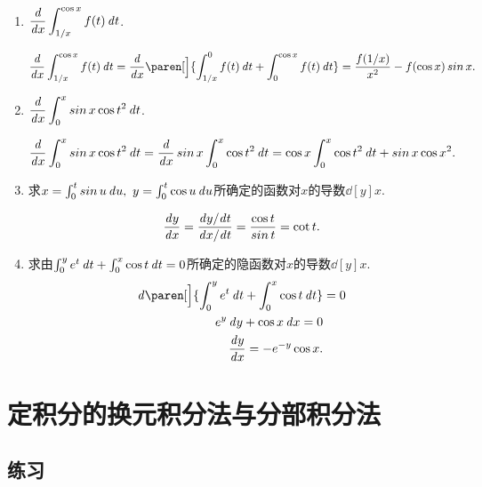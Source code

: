 \begin{enumerate}
\item \(\displaystyle \frac{\mathop{}\!\mathit{d}}{\mathop{}\!\mathit{d} x} \int_{1/x}^{\cos x} f(t) \mathop{}\!\mathit{d} t\).

  \ifshowsol
    \[
      \ddx \int_{1/x}^{\cos x} f(t) \dt
      = \ddx \paren[\Big]{\int_{1/x}^0 f(t) \dt + \int_0^{\cos x} f(t) \dt}
      = \frac{f(1/x)}{x^2} - f(\cos x) \sin x .
    \]
  \fi

\item \(\displaystyle \frac{\mathop{}\!\mathit{d}}{\mathop{}\!\mathit{d} x} \int_0^x \operatorname{\smash{sin}} x \cos t^2 \mathop{}\!\mathit{d} t\).

  \ifshowsol
    \[
      \frac{\mathop{}\!\mathit{d}}{\mathop{}\!\mathit{d} x} \int_0^x \operatorname{\smash{sin}} x \cos t^2 \mathop{}\!\mathit{d} t
      = \frac{\mathop{}\!\mathit{d}}{\mathop{}\!\mathit{d} x} \operatorname{\smash{sin}} x \int_0^x \cos t^2 \mathop{}\!\mathit{d} t
      = \cos x \int_0^x \cos t^2 \mathop{}\!\mathit{d} t + \operatorname{\smash{sin}} x \cos x^2.
    \]
  \fi

\item 求\(x = \int_0^t \operatorname{\smash{sin}} u \mathop{}\!\mathit{d} u,\ y = \int_0^t \cos u \mathop{}\!\mathit{d} u\)所确定的函数对\(x\)的导数\(\dd[y]x\).

  \ifshowsol
    \[
      \dd[y]x = \frac{\dy/\!\dt}{\dx/\!\dt}
      = \frac{\cos t}{\sin t}
      = \cot t.
    \]
  \fi

\item 求由\(\int_0^y e^t \mathop{}\!\mathit{d} t + \int_0^x \cos t \mathop{}\!\mathit{d} t = 0\)所确定的隐函数对\(x\)的导数\(\dd[y]x\).
  \[
    \begin{split}
      \diff\paren[\Big]{\int_0^y e^t \dt + \int_0^x \cos t \dt}
      &= 0 \\
      e^y \dy + \cos x \dx = 0 \\
      \dd[y]x = - e^{-y} \cos x.
    \end{split}
  \]
\end{enumerate}
\fi

\section{定积分的换元积分法与分部积分法}

\ifshowex
{}
\subsection*{练习}

